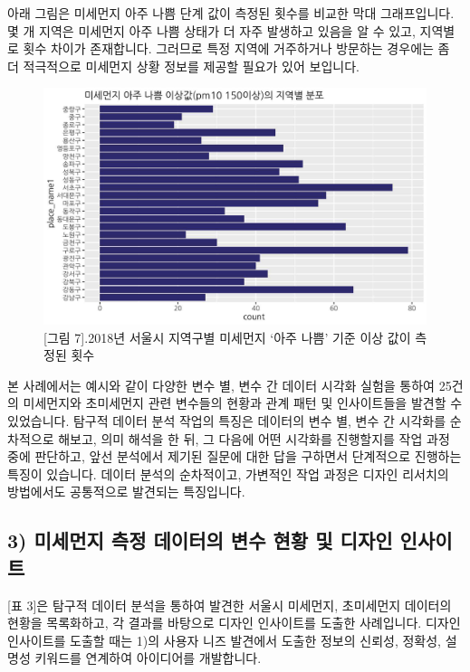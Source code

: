 \documentclass[
  letterpaper,
]{book}
\begin{document}
아래 그림은 미세먼지 아주 나쁨 단계 값이 측정된 횟수를 비교한 막대
그래프입니다. 몇 개 지역은 미세먼지 아주 나쁨 상태가 더 자주 발생하고
있음을 알 수 있고, 지역별로 횟수 차이가 존재합니다. 그러므로 특정 지역에
거주하거나 방문하는 경우에는 좀 더 적극적으로 미세먼지 상황 정보를
제공할 필요가 있어 보입니다.

\begin{figure}[H]

{\centering \includegraphics{img/fig7.png}

}

\caption{{[}그림 7{]}.2018년 서울시 지역구별 미세먼지 `아주 나쁨' 기준
이상 값이 측정된 횟수}

\end{figure}%

본 사례에서는 예시와 같이 다양한 변수 별, 변수 간 데이터 시각화 실험을
통하여 25건의 미세먼지와 초미세먼지 관련 변수들의 현황과 관계 패턴 및
인사이트들을 발견할 수 있었습니다. 탐구적 데이터 분석 작업의 특징은
데이터의 변수 별, 변수 간 시각화를 순차적으로 해보고, 의미 해석을 한 뒤,
그 다음에 어떤 시각화를 진행할지를 작업 과정 중에 판단하고, 앞선
분석에서 제기된 질문에 대한 답을 구하면서 단계적으로 진행하는 특징이
있습니다. 데이터 분석의 순차적이고, 가변적인 작업 과정은 디자인 리서치의
방법에서도 공통적으로 발견되는 특징입니다.

\subsection{3) 미세먼지 측정 데이터의 변수 현황 및 디자인
인사이트}\label{uxbbf8uxc138uxba3cuxc9c0-uxce21uxc815-uxb370uxc774uxd130uxc758-uxbcc0uxc218-uxd604uxd669-uxbc0f-uxb514uxc790uxc778-uxc778uxc0acuxc774uxd2b8}

{[}표 3{]}은 탐구적 데이터 분석을 통하여 발견한 서울시 미세먼지,
초미세먼지 데이터의 현황을 목록화하고, 각 결과를 바탕으로 디자인
인사이트를 도출한 사례입니다. 디자인 인사이트를 도출할 때는 1)의 사용자
니즈 발견에서 도출한 정보의 신뢰성, 정확성, 설명성 키워드를 연계하여
아이디어를 개발합니다.
\end{document}
